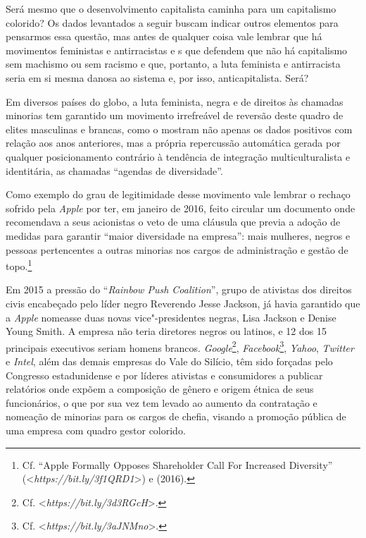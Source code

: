 Será mesmo que o desenvolvimento capitalista caminha para um capitalismo
colorido? Os dados levantados a seguir buscam indicar outros elementos
para pensarmos essa questão, mas antes de qualquer coisa vale lembrar
que há movimentos feministas e antirracistas e s que defendem que
não há capitalismo sem machismo ou sem racismo e que, portanto, a luta
feminista e antirracista seria em si mesma danosa ao sistema e, por
isso, anticapitalista. Será?

Em diversos países do globo, a luta feminista, negra e de direitos às
chamadas minorias tem garantido um movimento irrefreável de reversão
deste quadro de elites masculinas e brancas, como o mostram não apenas
os dados positivos com relação aos anos anteriores, mas a própria
repercussão automática gerada por qualquer posicionamento contrário à
tendência de integração multiculturalista e identitária, as chamadas
``agendas de diversidade''.

Como exemplo do grau de legitimidade desse movimento vale lembrar o
rechaço sofrido pela \emph{Apple} por ter, em janeiro de 2016, feito
circular um documento onde recomendava a seus acionistas o veto de uma
cláusula que previa a adoção de medidas para garantir ``maior
diversidade na empresa'': mais mulheres, negros e pessoas pertencentes a
outras minorias nos cargos de administração e gestão de topo.\footnote{Cf.
  ``Apple Formally Opposes Shareholder Call For Increased Diversity''
  (\textless{}\emph{https://bit.ly/3f1QRD1}\textgreater{})
  e  (2016).}

Em 2015 a pressão do ``\emph{Rainbow Push Coalition}'', grupo de
ativistas dos direitos civis encabeçado pelo líder negro Reverendo Jesse
Jackson, já havia garantido que a \emph{Apple} nomeasse duas novas
vice"-presidentes negras, Lisa Jackson e Denise Young Smith. A empresa
não teria diretores negros ou latinos, e 12 dos 15 principais executivos
seriam homens brancos. \emph{Google}\footnote{Cf.
  \textless{}\emph{https://bit.ly/3d3RGcH}\textgreater{}.},
\emph{Facebook}\footnote{Cf.
  \textless{}\emph{https://bit.ly/3aJNMno}\textgreater{}.},
\emph{Yahoo}, \emph{Twitter} e \emph{Intel}, além das demais empresas do
Vale do Silício, têm sido forçadas pelo Congresso estadunidense e por
líderes ativistas e consumidores a publicar relatórios onde expõem a
composição de gênero e origem étnica de seus funcionários, o que por sua
vez tem levado ao aumento da contratação e nomeação de minorias para os
cargos de chefia, visando a promoção pública de uma empresa com quadro
gestor colorido.

